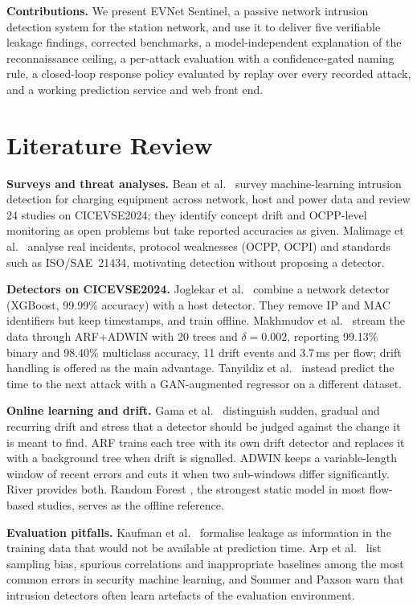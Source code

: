 \documentclass[conference]{IEEEtran}
\begin{document}
\textbf{Contributions.} We present EVNet Sentinel, a passive network intrusion detection system for the station network, and use it to deliver five verifiable leakage findings, corrected benchmarks, a model-independent explanation of the reconnaissance ceiling, a per-attack evaluation with a confidence-gated naming rule, a closed-loop response policy evaluated by replay over every recorded attack, and a working prediction service and web front end.

\section{Literature Review}
\label{sec:lit}

\textbf{Surveys and threat analyses.} Bean et al.\ \cite{b1} survey machine-learning intrusion detection for charging equipment across network, host and power data and review 24 studies on CICEVSE2024; they identify concept drift and OCPP-level monitoring as open problems but take reported accuracies as given. Malimage et al.\ \cite{b3} analyse real incidents, protocol weaknesses (OCPP, OCPI) and standards such as ISO/SAE~21434, motivating detection without proposing a detector.

\textbf{Detectors on CICEVSE2024.} Joglekar et al.\ \cite{b2} combine a network detector (XGBoost, 99.99\% accuracy) with a host detector. They remove IP and MAC identifiers but keep timestamps, and train offline. Makhmudov et al.\ \cite{b4} stream the data through ARF+ADWIN with 20 trees and $\delta = 0.002$, reporting 99.13\% binary and 98.40\% multiclass accuracy, 11 drift events and 3.7\,ms per flow; drift handling is offered as the main advantage. Tanyildiz et al.\ \cite{b5} instead predict the time to the next attack with a GAN-augmented regressor on a different dataset.

\textbf{Online learning and drift.} Gama et al.\ \cite{b15} distinguish sudden, gradual and recurring drift and stress that a detector should be judged against the change it is meant to find. ARF \cite{b6} trains each tree with its own drift detector and replaces it with a background tree when drift is signalled. ADWIN \cite{b7} keeps a variable-length window of recent errors and cuts it when two sub-windows differ significantly. River \cite{b9} provides both. Random Forest \cite{b16}, the strongest static model in most flow-based studies, serves as the offline reference.

\textbf{Evaluation pitfalls.} Kaufman et al.\ \cite{b10} formalise leakage as information in the training data that would not be available at prediction time. Arp et al.\ \cite{b11} list sampling bias, spurious correlations and inappropriate baselines among the most common errors in security machine learning, and Sommer and Paxson \cite{b13} warn that intrusion detectors often learn artefacts of the evaluation environment.
\end{document}
